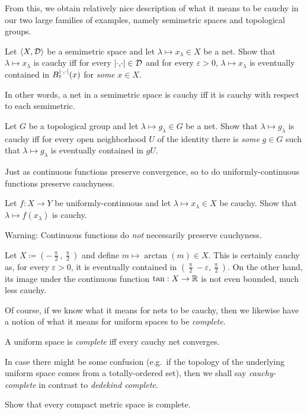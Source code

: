 From this, we obtain relatively nice description of what it means to be cauchy in our two large families of examples, namely semimetric spaces and topological groups.
\begin{exr}\label{exr4.5.3x}
Let $\langle X,\mathcal{D}\rangle$ be a semimetric space and let $\lambda \mapsto x_\lambda \in X$ be a net.  Show that $\lambda \mapsto x_\lambda$ is cauchy iff for every $\metric \in \mathcal{D}$ and for every $\varepsilon >0$, $\lambda \mapsto x_\lambda$ is eventually contained in $B_{\varepsilon}^{\metric}(x)$ for \emph{some} $x\in X$.
\begin{rmk}
In other words, a net in a semimetric space is cauchy iff it is cauchy with respect to each semimetric.
\end{rmk}
\end{exr}
\begin{exr}
Let $G$ be a topological group and let $\lambda \mapsto g_\lambda \in G$ be a net.  Show that $\lambda \mapsto g_\lambda$ is cauchy iff for every open neighborhood $U$ of the identity there is \emph{some} $g\in G$ such that $\lambda \mapsto g_\lambda$ is eventually contained in $gU$.
\end{exr}

Just as continuous functions preserve convergence, so to do uniformly-continuous functions preserve cauchyness.
\begin{exr}\label{exr4.5.3}
Let $f:X\rightarrow Y$ be uniformly-continuous and let $\lambda \mapsto x_\lambda \in X$ be cauchy.  Show that $\lambda \mapsto f(x_\lambda)$ is cauchy.
\end{exr}
Warning:  Continuous functions do \emph{not} necessarily preserve cauchyness.
\begin{exm}
Let $X \coloneqq (-\frac{\uppi}{2},\frac{\uppi}{2})$ and define $m\mapsto \arctan (m)\in X$.  This is certainly cauchy as, for every $\varepsilon >0$, it is eventually contained in $(\frac{\uppi}{2}-\varepsilon ,\frac{\uppi}{2})$.  On the other hand, its image under the continuous function $\tan :X\rightarrow \mathbb{R}$ is not even bounded, much less cauchy.
\end{exm}

Of course, if we know what it means for nets to be cauchy, then we likewise have a notion of what it means for uniform spaces to be \emph{complete}.
\begin{dfn}[Completeness]\label{Completeness}
A uniform space is \emph{complete} iff every cauchy net converges.
\begin{rmk}
In case there might be some confusion (e.g.~if the topology of the underlying uniform space comes from a totally-ordered set), then we shall say \emph{cauchy-complete} in contrast to \emph{dedekind complete}.
\end{rmk}
\end{dfn}
\begin{exr}
Show that every compact metric space is complete.
\end{exr}

